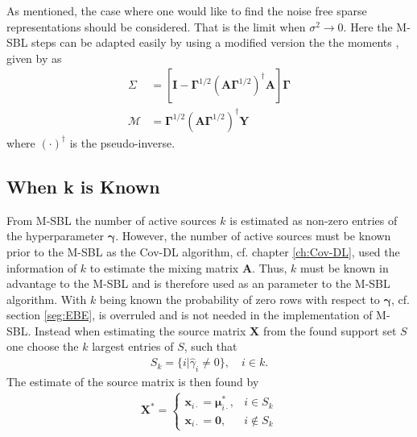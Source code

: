 As mentioned, the case where one would like to find the noise free sparse representations should be considered. That is the limit when $\sigma^2\rightarrow 0$. Here the M-SBL steps can be adapted easily by using a modified version the the moments , given by \cite[p.148]{phd_wipf} as 
\begin{align*}
\Sigma &= \left[ \textbf{I} - \boldsymbol{\Gamma}^{1/2} \left( \mathbf{A} \boldsymbol{\Gamma}^{1/2}\right)^{\dagger} \mathbf{A} \right]\boldsymbol{\Gamma}\\
\mathcal{M} &= \boldsymbol{\Gamma}^{1/2}\left( \mathbf{A} \boldsymbol{\Gamma}^{1/2}\right)^{\dagger} \mathbf{Y}
\end{align*}    
where $(\cdot)^{\dagger}$ is the pseudo-inverse.

\subsection{When k is Known}\label{subsec:kestimate}
From M-SBL the number of active sources $k$ is estimated as non-zero entries of the hyperparameter $\boldsymbol{\gamma}$.
However, the number of active sources must be known prior to the M-SBL as the Cov-DL algorithm, cf. chapter \ref{ch:Cov-DL}, used the information of $k$ to estimate the mixing matrix $\mathbf{A}$.
Thus, $k$ must be known in advantage to the M-SBL and is therefore used as an parameter to the M-SBL algorithm. 
With $k$ being known the probability of zero rows with respect to $\boldsymbol{\gamma}$, cf. section \ref{seg:EBE}, is overruled and is not needed in the implementation of M-SBL.
Instead when estimating the source matrix $\mathbf{X}$ from the found support set $S$ one choose the $k$ largest entries of $S$, such that \cite[p. 3]{Balkan2014}
\begin{align*}
S_k = \{ i \vert \hat{\gamma}_i \neq 0 \}, \quad i \in k.
\end{align*}
The estimate of the source matrix is then found by
\begin{align*}
\mathbf{X}^\ast = 
\begin{cases}
\mathbf{x}_{i\cdot} = \boldsymbol{\mu}_{i \cdot}^\ast, & i \in S_k \\
\mathbf{x}_{i\cdot} = \mathbf{0}, & i \not \in S_k
\end{cases}
\end{align*}



